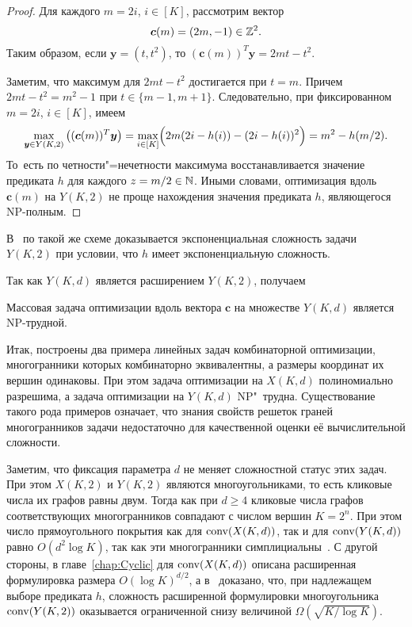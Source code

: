 \begin{proof}
	Для каждого $m = 2i$,  $i \in [K]$, рассмотрим вектор
	\[
	\bm{c}(m) = (2m, -1) \in \mathbb{Z}^2.
	\]
	Таким образом, если $\bm{y} = (t, t^2)$, то $(\bm{c}(m))^T \bm{y} = 2mt - t^2$.
	
	Заметим, что максимум для $2mt - t^2$ достигается при $t = m$.
	Причем $2mt - t^2 = m^2 - 1$ при $t \in \{m-1, m+1\}$.
	Следовательно, при фиксированном $m = 2i$,  $i \in [K]$, имеем
	\[
	\max_{\bm{y}\in Y(K,2)} \left((\bm{c}(m))^T \bm{y}\right) = 
	\max_{i \in [K]} \Bigl(2 m (2i - h(i)) - (2i - h(i))^2\Bigr) =
	m^2 - h(m/2).
	\]
	То~есть по четности"=нечетности максимума восстанавливается значение предиката $h$ для каждого $z = m/2 \in \mathbb{N}$.
	Иными словами, оптимизация вдоль $\bm{c}(m)$ на $Y(K,2)$ не проще нахождения значения предиката $h$, являющегося NP-полным.
\end{proof}

\begin{remark}
В~\cite{Maksimenko:2016complexity} по такой же схеме доказывается экспоненциальная сложность задачи $Y(K,2)$ при условии, что $h$ имеет экспоненциальную сложность. 
\end{remark}

Так как $Y(K,d)$ является расширением $Y(K,2)$, получаем

\begin{corollary}
Массовая задача оптимизации вдоль вектора $\bm{c}$ на множестве $Y(K,d)$ является NP-трудной.
\end{corollary}

Итак, построены два примера линейных задач комбинаторной оптимизации, многогранники которых комбинаторно эквивалентны, а размеры координат их вершин одинаковы. 
При этом задача оптимизации на $X(K,d)$ полиномиально разрешима, 
а задача оптимизации на $Y(K,d)$ NP"~трудна. 
Существование такого рода примеров означает, что знания свойств решеток граней многогранников задачи недостаточно для качественной оценки её вычислительной сложности.

Заметим, что фиксация параметра $d$ не меняет сложностной статус этих задач.
При этом $X(K,2)$ и $Y(K,2)$ являются многоугольниками, то есть кликовые числа их графов равны двум. Тогда как при $d \ge 4$ кликовые числа графов соответствующих многогранников совпадают с числом вершин $K = 2^n$.
При этом число прямоугольного покрытия как для $\operatorname{conv}(X(K,d))$, так и для $\operatorname{conv}(Y(K,d))$ равно $O(d^2 \log K)$, так как эти многогранники симплициальны~\cite{FioriniKPT:13}.
С другой стороны, в главе~\ref{chap:Cyclic} для $\operatorname{conv}(X(K,d))$ описана расширенная формулировка размера $O(\log K)^{d/2}$, а в~\cite{Fiorini:2012polygons} доказано, что, при надлежащем выборе предиката $h$, %
сложность расширенной формулировки многоугольника $\operatorname{conv}(Y(K,2))$ оказывается ограниченной снизу величиной $\Omega\left(\sqrt{K / \log K}\right)$.

